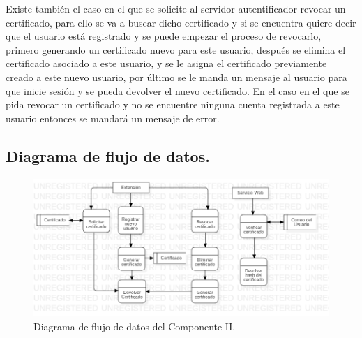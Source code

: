 \documentclass[12pt, a4paper, titlepage]{report}
\begin{document}
    	    Existe también el caso en el que se solicite al servidor autentificador revocar un certificado, para ello se va a buscar dicho certificado y si se encuentra quiere decir que el usuario está registrado y se puede empezar el proceso de revocarlo, primero generando un certificado nuevo para este usuario, después se elimina el certificado asociado a este usuario, y se le asigna el certificado previamente creado a este nuevo usuario, por último se le manda un mensaje al usuario para que inicie sesión y se pueda devolver el nuevo certificado. En el caso en el que se pida revocar un certificado y no se encuentre ninguna cuenta registrada a este usuario entonces se mandará un mensaje de error.
    		
    		\subsection{Diagrama de flujo de datos.}
    		\begin{figure}[H]
            	\begin{center}	\includegraphics[width=13cm]{./imagenes/Disenio/Componente_2/CII_DFD.png}
            	\caption{Diagrama de flujo de datos del Componente II.}
            	\end{center}
    		\end{figure}
    		
\end{document}

